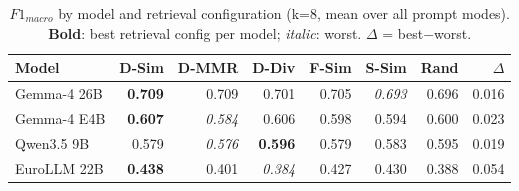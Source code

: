 \begin{table}[t]
\centering
\caption{$F1_{macro}$ by model and retrieval configuration (k=8, mean over all prompt modes). \textbf{Bold}: best retrieval config per model; \textit{italic}: worst. $\Delta$ = best$-$worst.}
\label{tab:a3-model-retrieval}
\small
\begin{tabular}{lrrrrrrr}
\toprule
Model & D-Sim & D-MMR & D-Div & F-Sim & S-Sim & Rand & $\Delta$ \\
\midrule
Gemma-4 26B & \textbf{0.709} & 0.709 & 0.701 & 0.705 & \textit{0.693} & 0.696 & 0.016 \\
Gemma-4 E4B & \textbf{0.607} & \textit{0.584} & 0.606 & 0.598 & 0.594 & 0.600 & 0.023 \\
Qwen3.5 9B & 0.579 & \textit{0.576} & \textbf{0.596} & 0.579 & 0.583 & 0.595 & 0.019 \\
EuroLLM 22B & \textbf{0.438} & 0.401 & \textit{0.384} & 0.427 & 0.430 & 0.388 & 0.054 \\
\bottomrule
\end{tabular}
\end{table}